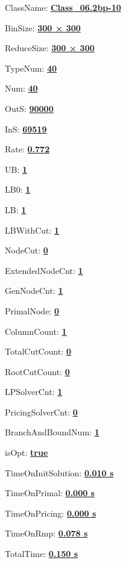 \documentclass[11pt]{article}
\begin{document}
\pagestyle{empty}


ClassName: \underline{\textbf{Class_06.2bp-10}}
\par
BinSize: \underline{\textbf{300 × 300}}
\par
ReduceSize: \underline{\textbf{300 × 300}}
\par
TypeNum: \underline{\textbf{40}}
\par
Num: \underline{\textbf{40}}
\par
OutS: \underline{\textbf{90000}}
\par
InS: \underline{\textbf{69519}}
\par
Rate: \underline{\textbf{0.772}}
\par
UB: \underline{\textbf{1}}
\par
LB0: \underline{\textbf{1}}
\par
LB: \underline{\textbf{1}}
\par
LBWithCut: \underline{\textbf{1}}
\par
NodeCut: \underline{\textbf{0}}
\par
ExtendedNodeCnt: \underline{\textbf{1}}
\par
GenNodeCnt: \underline{\textbf{1}}
\par
PrimalNode: \underline{\textbf{0}}
\par
ColumnCount: \underline{\textbf{1}}
\par
TotalCutCount: \underline{\textbf{0}}
\par
RootCutCount: \underline{\textbf{0}}
\par
LPSolverCnt: \underline{\textbf{1}}
\par
PricingSolverCnt: \underline{\textbf{0}}
\par
BranchAndBoundNum: \underline{\textbf{1}}
\par
isOpt: \underline{\textbf{true}}
\par
TimeOnInitSolution: \underline{\textbf{0.010 s}}
\par
TimeOnPrimal: \underline{\textbf{0.000 s}}
\par
TimeOnPricing: \underline{\textbf{0.000 s}}
\par
TimeOnRmp: \underline{\textbf{0.078 s}}
\par
TotalTime: \underline{\textbf{0.150 s}}
\par
\newpage
\end{document}
